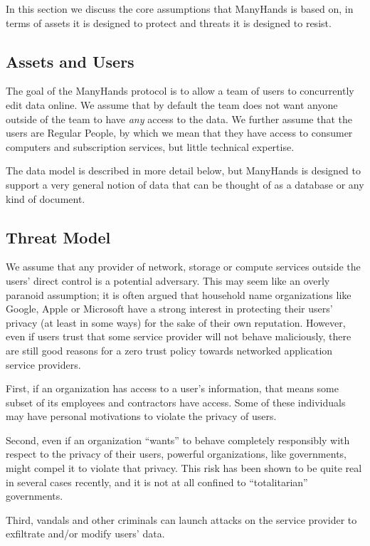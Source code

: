 \documentclass[pldi,10pt]{sigplanconf-pldi16}
\begin{document}
In this section we discuss the core assumptions that ManyHands is based on, in terms of assets it is designed to protect and threats it is designed to resist.

\subsection{Assets and Users}

The goal of the ManyHands protocol is to allow a team of users to concurrently edit data online.
We assume that by default the team does not want anyone outside of the team to have \emph{any} access to the data.
We further assume that the users are Regular People\texttrademark, by which we mean that they have access to consumer computers and subscription services, but little technical expertise.

The data model is described in more detail below, but ManyHands is designed to support a very general notion of data that can be thought of as a database or any kind of document.

\subsection{Threat Model}

We assume that any provider of network, storage or compute services outside the users' direct control is a potential adversary.
This may seem like an overly paranoid assumption; it is often argued that household name organizations like Google, Apple or Microsoft have a strong interest in protecting their users' privacy (at least in some ways) for the sake of their own reputation.
However, even if users trust that some service provider will not behave maliciously, there are still good reasons for a zero trust policy towards networked application service providers.

First, if an organization has access to a user's information, that means some subset of its employees and contractors have access.
Some of these individuals may have personal motivations to violate the privacy of users.

Second, even if an organization ``wants'' to behave completely responsibly with respect to the privacy of their users, powerful organizations, like governments, might compel it to violate that privacy.
This risk has been shown to be quite real in several cases recently, and it is not at all confined to ``totalitarian'' governments.

Third, vandals and other criminals can launch attacks on the service provider to exfiltrate and/or modify users' data.
\end{document}
